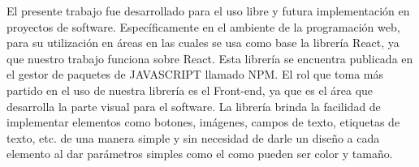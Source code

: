 El presente trabajo fue desarrollado para el uso libre y futura implementación en proyectos de software. Específicamente en el ambiente de la programación web, para su utilización en áreas en las cuales se usa como base la librería React, ya que nuestro trabajo funciona sobre React.
 \newline
  \newline
Esta librería se encuentra publicada en el gestor de paquetes de JAVASCRIPT llamado NPM. 
 \newline
  \newline
El rol que toma más partido en el uso de nuestra librería es el Front-end, ya que es el área que desarrolla la parte visual para el software. La librería brinda la facilidad de implementar elementos como botones, imágenes, campos de texto, etiquetas de texto, etc. de una manera simple y sin necesidad de darle un diseño a cada elemento al dar parámetros simples como el como pueden ser color y tamaño.
